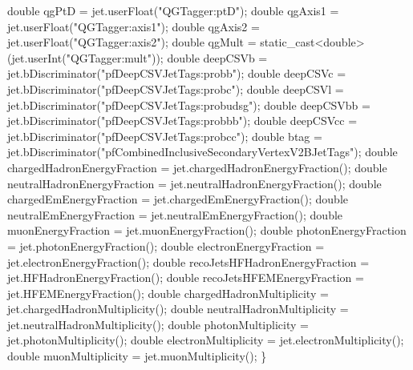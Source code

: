 \begin{DoxyCode}
    \textcolor{keywordtype}{double} qgPtD = jet.userFloat(\textcolor{stringliteral}{"QGTagger:ptD"});
    \textcolor{keywordtype}{double} qgAxis1 = jet.userFloat(\textcolor{stringliteral}{"QGTagger:axis1"});
    \textcolor{keywordtype}{double} qgAxis2 = jet.userFloat(\textcolor{stringliteral}{"QGTagger:axis2"});
    \textcolor{keywordtype}{double} qgMult = \textcolor{keyword}{static\_cast<}\textcolor{keywordtype}{double}\textcolor{keyword}{>}(jet.userInt(\textcolor{stringliteral}{"QGTagger:mult"}));
    \textcolor{keywordtype}{double} deepCSVb = jet.bDiscriminator(\textcolor{stringliteral}{"pfDeepCSVJetTags:probb"});
    \textcolor{keywordtype}{double} deepCSVc = jet.bDiscriminator(\textcolor{stringliteral}{"pfDeepCSVJetTags:probc"});
    \textcolor{keywordtype}{double} deepCSVl = jet.bDiscriminator(\textcolor{stringliteral}{"pfDeepCSVJetTags:probudsg"});
    \textcolor{keywordtype}{double} deepCSVbb = jet.bDiscriminator(\textcolor{stringliteral}{"pfDeepCSVJetTags:probbb"});
    \textcolor{keywordtype}{double} deepCSVcc = jet.bDiscriminator(\textcolor{stringliteral}{"pfDeepCSVJetTags:probcc"});
    \textcolor{keywordtype}{double} btag = jet.bDiscriminator(\textcolor{stringliteral}{"pfCombinedInclusiveSecondaryVertexV2BJetTags"});
    \textcolor{keywordtype}{double} chargedHadronEnergyFraction = jet.chargedHadronEnergyFraction();
    \textcolor{keywordtype}{double} neutralHadronEnergyFraction = jet.neutralHadronEnergyFraction();
    \textcolor{keywordtype}{double} chargedEmEnergyFraction = jet.chargedEmEnergyFraction();
    \textcolor{keywordtype}{double} neutralEmEnergyFraction = jet.neutralEmEnergyFraction();
    \textcolor{keywordtype}{double} muonEnergyFraction = jet.muonEnergyFraction();
    \textcolor{keywordtype}{double} photonEnergyFraction = jet.photonEnergyFraction();
    \textcolor{keywordtype}{double} electronEnergyFraction = jet.electronEnergyFraction();
    \textcolor{keywordtype}{double} recoJetsHFHadronEnergyFraction = jet.HFHadronEnergyFraction();
    \textcolor{keywordtype}{double} recoJetsHFEMEnergyFraction = jet.HFEMEnergyFraction();
    \textcolor{keywordtype}{double} chargedHadronMultiplicity = jet.chargedHadronMultiplicity();
    \textcolor{keywordtype}{double} neutralHadronMultiplicity = jet.neutralHadronMultiplicity();
    \textcolor{keywordtype}{double} photonMultiplicity = jet.photonMultiplicity();
    \textcolor{keywordtype}{double} electronMultiplicity = jet.electronMultiplicity();
    \textcolor{keywordtype}{double} muonMultiplicity = jet.muonMultiplicity();
\}
\end{DoxyCode}


